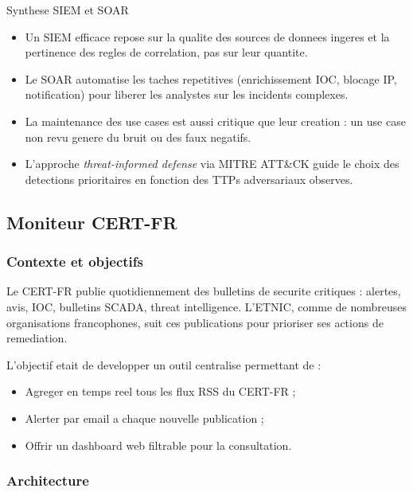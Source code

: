 \documentclass{rapport}
\begin{document}
\begin{boitetech}{Synthese SIEM et SOAR}
\begin{itemize}[noitemsep]
  \item Un SIEM efficace repose sur la qualite des sources de donnees
        ingeres et la pertinence des regles de correlation, pas sur leur
        quantite.
  \item Le SOAR automatise les taches repetitives (enrichissement IOC,
        blocage IP, notification) pour liberer les analystes sur les
        incidents complexes.
  \item La maintenance des use cases est aussi critique que leur creation :
        un use case non revu genere du bruit ou des faux negatifs.
  \item L'approche \textit{threat-informed defense} via MITRE ATT\&CK guide
        le choix des detections prioritaires en fonction des TTPs
        adversariaux observes.
\end{itemize}
\end{boitetech}

\subsection{Moniteur CERT-FR}

\subsubsection{Contexte et objectifs}

Le CERT-FR publie quotidiennement des bulletins de securite critiques :
alertes, avis, IOC, bulletins SCADA, threat intelligence. L'ETNIC, comme
de nombreuses organisations francophones, suit ces publications pour
prioriser ses actions de remediation.

L'objectif etait de developper un outil centralise permettant de :
\begin{itemize}
  \item Agreger en temps reel tous les flux RSS du CERT-FR ;
  \item Alerter par email a chaque nouvelle publication ;
  \item Offrir un dashboard web filtrable pour la consultation.
\end{itemize}

\subsubsection{Architecture}
\end{document}
